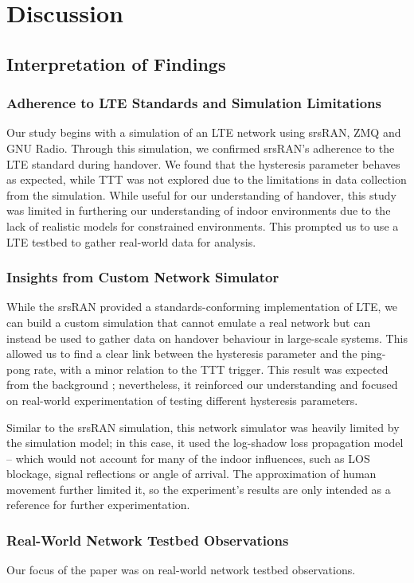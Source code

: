 \chapter{Discussion}

\section{Interpretation of Findings}
\subsection{Adherence to LTE Standards and Simulation Limitations}
Our study begins with a simulation of an LTE network using srsRAN, ZMQ and GNU Radio. Through this simulation, we confirmed srsRAN's adherence to the LTE standard during handover. We found that the hysteresis parameter behaves as expected, while TTT was not explored due to the limitations in data collection from the simulation. While useful for our understanding of handover, this study was limited in furthering our understanding of indoor environments due to the lack of realistic models for constrained environments. This prompted us to use a LTE testbed to gather real-world data for analysis.

\subsection{Insights from Custom Network Simulator}
While the srsRAN provided a standards-conforming implementation of LTE, we can build a custom simulation that cannot emulate a real network but can instead be used to gather data on handover behaviour in large-scale systems. This allowed us to find a clear link between the hysteresis parameter and the ping-pong rate, with a minor relation to the TTT trigger. This result was expected from the background \insertref; nevertheless, it reinforced our understanding and focused on real-world experimentation of testing different hysteresis parameters.

Similar to the srsRAN simulation, this network simulator was heavily limited by the simulation model; in this case, it used the log-shadow loss propagation model -- which would not account for many of the indoor influences, such as LOS blockage, signal reflections or angle of arrival. The approximation of human movement further limited it, so the experiment's results are only intended as a reference for further experimentation.

\subsection{Real-World Network Testbed Observations}
Our focus of the paper was on real-world network testbed observations. 

